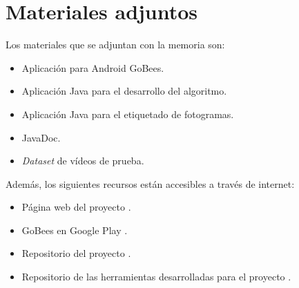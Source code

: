 \section{Materiales adjuntos}\label{materiales-adjuntos}

Los materiales que se adjuntan con la memoria son: 

\begin{itemize}
\tightlist
\item
	Aplicación para Android GoBees.
\item
	Aplicación Java para el desarrollo del algoritmo.
\item	
	Aplicación Java para el etiquetado de fotogramas.
\item	
	JavaDoc.
\item	
	\emph{Dataset} de vídeos de prueba.
\end{itemize}

Además, los siguientes recursos están accesibles a través de internet:

\begin{itemize}
\tightlist
\item
  Página web del proyecto \citep{gobees:web}.
\item
  GoBees en Google Play \citep{gobees:play}.
\item
  Repositorio del proyecto \citep{gobees:repo}.
\item
  Repositorio de las herramientas desarrolladas para el proyecto \citep{gobees:prototipes}.
\end{itemize}
